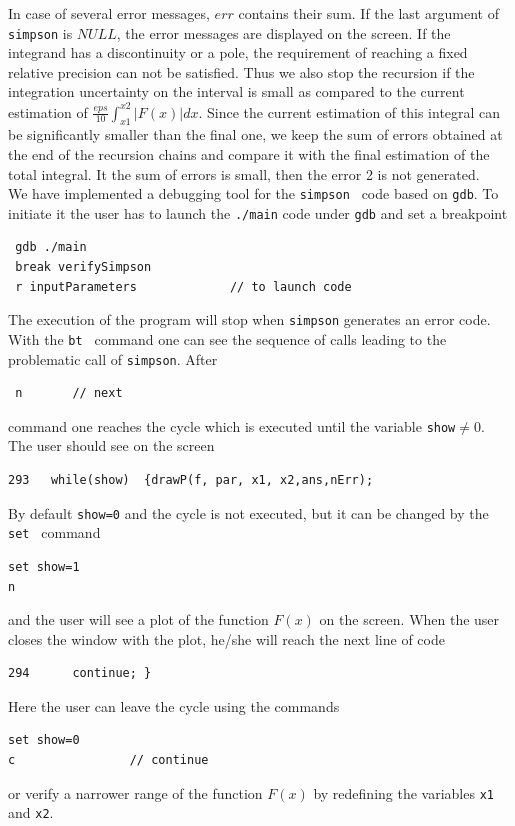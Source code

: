 \documentclass[12pt,a4paper]{article}
\begin{document}
In case of several error messages, $err$ contains their sum.  If the last argument of \verb|simpson| is $NULL$, the error messages are displayed on  the screen. If the integrand has a discontinuity or a pole, the requirement  of reaching a fixed relative precision can not be satisfied. Thus  we also stop the recursion if the integration uncertainty on the interval is small as compared to the current estimation of $\frac{eps}{10} \int_{x1}^{x2}|F(x)|dx$. Since the current estimation of this integral can be significantly smaller than the final one,   we keep the sum of errors obtained at  the end of the recursion chains  and compare it with the final estimation of the  total integral. It the sum of errors is small, then the error 2 is not generated.  \\

We have implemented a debugging tool for the {\tt simpson } code based on {\tt  gdb}. To initiate it the user
has to launch the {\tt ./main} code under {\tt gdb} and set a breakpoint 
\begin{verbatim}
 gdb ./main
 break verifySimpson
 r inputParameters             // to launch code 
\end{verbatim}
The execution of the program will stop when {\tt simpson} generates an error code. With the {\tt  bt }
command one can see the sequence of calls leading to the problematic  call  of  {\tt simpson}. After 
\begin{verbatim}
 n       // next 
\end{verbatim}
command one reaches the  cycle which is executed until the  variable {\tt show}$\ne 0$. The user should see on the
screen
\begin{verbatim}
293	  while(show)  {drawP(f, par, x1, x2,ans,nErr); 
\end{verbatim}
 By default {\tt show=0}
and the cycle is not executed, but it can be changed by the {\tt set } command    
\begin{verbatim}
set show=1
n
\end{verbatim}
and the user  will see a plot of the  function $F(x)$ on the screen. When the user closes the window with the plot, he/she
will reach the next line of code
\begin{verbatim}
294	     continue; } 
\end{verbatim}
Here the user can leave the cycle using the commands
\begin{verbatim}
set show=0
c                // continue
\end{verbatim} 
or verify a narrower range   of the function $F(x)$ by redefining the variables {\tt x1} and {\tt x2}. 
\end{document}
